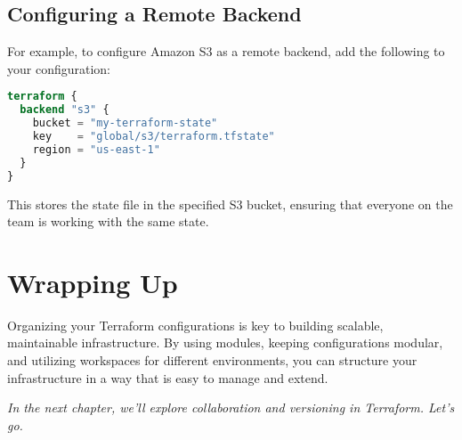 \subsection{Configuring a Remote Backend}

For example, to configure Amazon S3 as a remote backend, add the following to your configuration:

\begin{lstlisting}[language=terraform]
terraform {
  backend "s3" {
    bucket = "my-terraform-state"
    key    = "global/s3/terraform.tfstate"
    region = "us-east-1"
  }
}
\end{lstlisting}

This stores the state file in the specified S3 bucket, ensuring that everyone on the team is working with the same state.

\section{Wrapping Up}

Organizing your Terraform configurations is key to building scalable, maintainable infrastructure. By using modules, keeping configurations modular, and utilizing workspaces for different environments, you can structure your infrastructure in a way that is easy to manage and extend.

\vspace{1em}

\textit{In the next chapter, we'll explore collaboration and versioning in Terraform. Let's go.}

